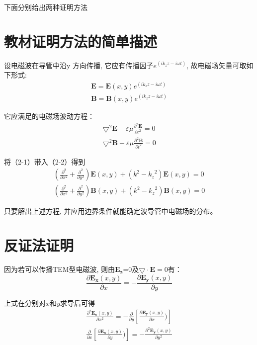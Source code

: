 \documentclass[bachelor]{thesis-uestc}
\begin{document}
下面分别给出两种证明方法
	
\section{教材证明方法的简单描述}

设电磁波在导管中沿y 方向传播, 它应有传播因子$e^{(ik_zz-i \omega t)}$, 故电磁场矢量可取如下形式:
\begin{equation}
	\begin{aligned}
		\bm{E}=\bm{E}(x,y)e^{(ik_zz-i \omega t)}\\
		\bm{B}=\bm{B}(x,y)e^{(ik_zz-i \omega t)}
	\end{aligned}
\end{equation}

它应满足的电磁场波动方程：
\begin{equation}
	\begin{aligned}
        \bm{\bigtriangledown}^2\bm{E}-\varepsilon\mu\frac{\partial^2\bm{E}}{\partial t^2}=0\\
        \bm{\bigtriangledown}^2\bm{B}-\varepsilon\mu\frac{\partial^2\bm{B}}{\partial t^2}=0
	\end{aligned}
\end{equation}

将（2-1）带入（2-2）得到
\begin{equation}
	\begin{aligned}
	(\frac{\partial^2}{\partial x^2}+\frac{\partial^2}{\partial y^2})\bm{E}(x,y)+(k^2-{k_z}^2)\bm{E}(x,y)=0\\
	(\frac{\partial^2}{\partial x^2}+\frac{\partial^2}{\partial y^2})\bm{B}(x,y)+(k^2-{k_z}^2)\bm{B}(x,y)=0
	\end{aligned}
\end{equation}

只要解出上述方程, 并应用边界条件就能确定波导管中电磁场的分布。


\section{反证法证明}

因为若可以传播TEM型电磁波, 则由$\bm{E_z}$=0及$\bigtriangledown\cdot\bm{E}=0$有：
\begin{equation}
	\frac{\partial\bm{E_x}(x,y)}{\partial x}=-\frac{\partial\bm{E_y}(x,y)}{\partial y}
\end{equation}

上式在分别对$x$和$y$求导后可得
\begin{equation}
	\begin{aligned}
	\frac{\partial^2\bm{E_x}(x,y)}{\partial x^2}=-\frac{\partial}{\partial y}[\frac{\partial\bm{E_y}(x,y)}{\partial x})]\\
	\frac{\partial}{\partial x}[\frac{\partial\bm{E_x}(x,y)}{\partial y})]=-\frac{\partial^2\bm{E_y}(x,y)}{\partial y^2}
	\end{aligned}
\end{equation}
\end{document}
